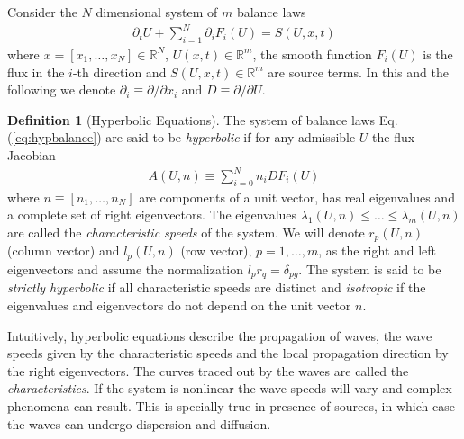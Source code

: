 \documentclass[11pt, reqno]{amsart}
\newcommand{\eqr}[1]{Eq.\thinspace(#1)}
\newcommand{\spfrac}[2]{{\partial_{#1}} {#2}}
\theoremstyle{definition}
\newtheorem{dfn}{Definition}
\begin{document}
Consider the $N$ dimensional system of $m$ balance laws
\begin{align}
  \spfrac{t}{U} + \sum_{i=1}^N \spfrac{i}{F_i(U)} = S(U,x,t) 
  \label{eq:hypbalance}
\end{align}
where $x = [x_1,\ldots,x_N] \in \mathbb{R}^N$, $U(x,t) \in
\mathbb{R}^m$, the smooth function $F_i(U)$ is the flux in the $i$-th
direction and $S(U,x,t) \in \mathbb{R}^m$ are source terms. In this
and the following we denote $\partial_i \equiv \partial/\partial x_i$
and $D \equiv \partial/\partial U$.

\begin{dfn}[Hyperbolic Equations]
  The system of balance laws \eqr{\ref{eq:hypbalance}} are said to be
  \emph{hyperbolic} if for any admissible $U$ the flux Jacobian
  \begin{align}
    A(U,n) \equiv \sum_{i=0}^N n_i DF_i(U)
  \end{align}
  where $n\equiv [n_1,\ldots,n_N]$ are components of a unit vector,
  has real eigenvalues and a complete set of right eigenvectors. The
  eigenvalues $\lambda_1(U,n) \le \ldots \le \lambda_m(U,n)$ are
  called the \emph{characteristic speeds} of the system. We will
  denote $r_p(U,n)$ (column vector) and $l_p(U,n)$ (row vector),
  $p=1,\ldots,m$, as the right and left eigenvectors and assume the
  normalization $l_p r_q = \delta_{pg}$.  The system is said to be
  \emph{strictly hyperbolic} if all characteristic speeds are distinct
  and \emph{isotropic} if the eigenvalues and eigenvectors do not
  depend on the unit vector $n$.
\end{dfn}

Intuitively, hyperbolic equations describe the propagation of waves,
the wave speeds given by the characteristic speeds and the local
propagation direction by the right eigenvectors. The curves traced out
by the waves are called the \emph{characteristics}. If the system is
nonlinear the wave speeds will vary and complex phenomena can
result. This is specially true in presence of sources, in which case
the waves can undergo dispersion and diffusion.
\end{document}
